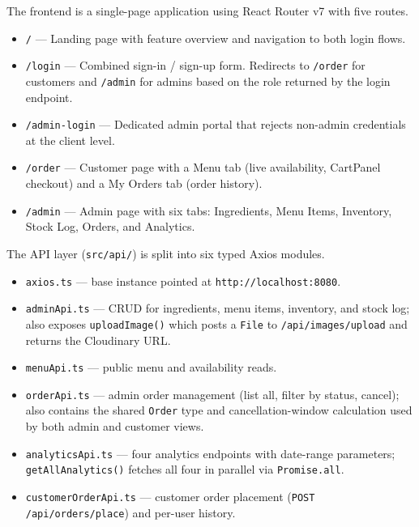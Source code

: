 \documentclass[12pt,a4paper]{article}
\begin{document}
The frontend is a single-page application using React Router v7 with five
routes.

\begin{itemize}
    \item \texttt{/} --- Landing page with feature overview and navigation to
          both login flows.
    \item \texttt{/login} --- Combined sign-in / sign-up form. Redirects to
          \texttt{/order} for customers and \texttt{/admin} for admins based
          on the role returned by the login endpoint.
    \item \texttt{/admin-login} --- Dedicated admin portal that rejects
          non-admin credentials at the client level.
    \item \texttt{/order} --- Customer page with a Menu tab (live availability,
          CartPanel checkout) and a My Orders tab (order history).
    \item \texttt{/admin} --- Admin page with six tabs: Ingredients, Menu Items,
          Inventory, Stock Log, Orders, and Analytics.
\end{itemize}

The API layer (\texttt{src/api/}) is split into six typed Axios modules.

\begin{itemize}
    \item \texttt{axios.ts} --- base instance pointed at
          \texttt{http://localhost:8080}.
    \item \texttt{adminApi.ts} --- CRUD for ingredients, menu items, inventory,
          and stock log; also exposes \texttt{uploadImage()} which posts a
          \texttt{File} to \texttt{/api/images/upload} and returns the
          Cloudinary URL.
    \item \texttt{menuApi.ts} --- public menu and availability reads.
    \item \texttt{orderApi.ts} --- admin order management (list all, filter by
          status, cancel); also contains the shared \texttt{Order} type and
          cancellation-window calculation used by both admin and customer views.
    \item \texttt{analyticsApi.ts} --- four analytics endpoints with date-range
          parameters; \texttt{getAllAnalytics()} fetches all four in parallel
          via \texttt{Promise.all}.
    \item \texttt{customerOrderApi.ts} --- customer order placement
          (\texttt{POST /api/orders/place}) and per-user history.
\end{itemize}
\end{document}
